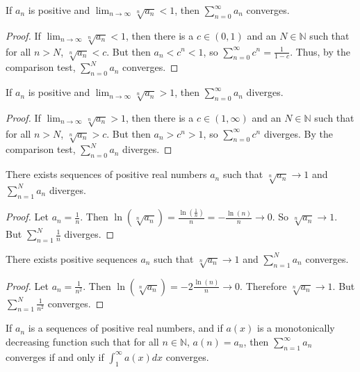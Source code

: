             \begin{theorem}
            If $a_n$ is positive and $\lim_{n\rightarrow \infty} \sqrt[n]{a_n}<1$, then $\sum_{n=0}^{\infty} a_n$ converges.
            \end{theorem}
            \begin{proof}
            If $\lim_{n\rightarrow \infty}\sqrt[n]{a_n}<1$, then there is a $c\in (0,1)$ and an $N\in \mathbb{N}$ such that for all $n>N$, $\sqrt[n]{a_n}<c$. But then $a_n<c^n<1$, so $\sum_{n=0}^{\infty}c^n = \frac{1}{1-c}$. Thus, by the comparison test, $\sum_{n=0}^{N}a_n$ converges.
            \end{proof}
            \begin{theorem}
            If $a_n$ is positive and $\lim_{n\rightarrow \infty} \sqrt[n]{a_n}>1$, then $\sum_{n=0}^{\infty} a_n$ diverges.
            \end{theorem}
            \begin{proof}
            If $\lim_{n\rightarrow \infty}\sqrt[n]{a_n}>1$, then there is a $c\in (1,\infty)$ and an $N\in \mathbb{N}$ such that for all $n>N$, $\sqrt[n]{a_n}>c$. But then $a_n>c^n>1$, so $\sum_{n=0}^{\infty}c^n$ diverges. By the comparison test, $\sum_{n=0}^{N}a_n$ diverges.
            \end{proof}
            \begin{theorem}
            There exists sequences of positive real numbers $a_n$ such that $\sqrt[n]{a_n} \rightarrow 1$ and $\sum_{n=1}^{N} a_n$ diverges.
            \end{theorem}
            \begin{proof}
            Let $a_n = \frac{1}{n}$. Then $\ln(\sqrt[n]{a_n}) = \frac{\ln(\frac{1}{n})}{n} = -\frac{\ln(n)}{n} \rightarrow 0$. So $\sqrt[n]{a_n} \rightarrow 1$. But $\sum_{n=1}^{N} \frac{1}{n}$ diverges.
            \end{proof}
            \begin{theorem}
            There exists positive sequences $a_{n}$ such that $\sqrt[n]{a_n} \rightarrow 1$ and $\sum_{n=1}^{N}a_n$ converges.
            \end{theorem}
            \begin{proof}
            Let $a_{n}=\frac{1}{n^2}$. Then $\ln(\sqrt[n]{a_n})=-2\frac{\ln(n)}{n}\rightarrow 0$. Therefore $\sqrt[n]{a_n}\rightarrow 1$. But $\sum_{n=1}^{N}\frac{1}{n^2}$ converges.
            \end{proof}
            \begin{theorem}
            If $a_n$ is a sequences of positive real numbers, and if $a(x)$ is a monotonically decreasing function such that for all $n\in \mathbb{N}$, $a(n) = a_n$, then $\sum_{n=1}^{\infty} a_n$ converges if and only if $\int_{1}^{\infty} a(x)dx$ converges.
            \end{theorem}
